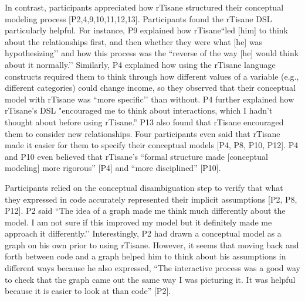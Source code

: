 In contrast, participants appreciated how rTisane structured their
conceptual modeling process [P2,4,9,10,11,12,13]. Participants found the rTisane
DSL particularly helpful. For instance, P9 explained how rTisane``led [him] to
think about the relationships first, and then whether they were what [he] was
hypothesizing’’ and how this process was the ``reverse of the way [he] would
think about it normally.’’ Similarly, P4 explained how using the rTisane
language constructs required them to think through how different values of a
variable (e.g., different categories) could change income, so they observed that
their conceptual model with rTisane was ``more specific’’ than without. P4
further explained how rTisane’s DSL "encouraged me to think about interactions,
which I hadn't thought about before using rTisane.” P13 also found that rTisane
encouraged them to consider new relationships. Four participants even said that
rTisane made it easier for them to specify their conceptual models [P4, P8, P10,
P12]. P4 and P10 even believed that rTisane’s “formal structure made [conceptual
modeling] more rigorous” [P4] and ``more disciplined'' [P10].

Participants relied on the conceptual disambiguation step to verify that what
they expressed in code accurately represented their implicit assumptions [P2,
P8, P12]. P2 said ``The idea of a graph made me think much differently about the
model. I am not sure if this improved my model but it definitely made me
approach it differently.’’ Interestingly, P2 had drawn a conceptual model as a
graph on his own prior to using rTisane. However, it seems that moving back and
forth between code and a graph helped him to think about his assumptions in
different ways because he also expressed, “The interactive process was a good
way to check that the graph came out the same way I was picturing it. It was
helpful because it is easier to look at than code'' [P2]. 

